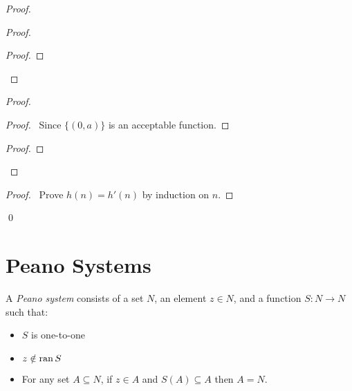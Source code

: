 \begin{proof}
    \begin{proof}
        \begin{proof}
        \end{proof}
    \end{proof}
    \begin{proof}
        \begin{proof}
            \pf\ Since $\{(0,a)\}$ is an acceptable function.
        \end{proof}
        \begin{proof}
        \end{proof}
    \end{proof}
    \begin{proof}
        \pf\ Prove $h(n) = h'(n)$ by induction on $n$.
    \end{proof}
    \qed
\end{proof}

\section{Peano Systems}

\begin{definition}
    A \emph{Peano system} consists of a set $N$, an element $z \in N$,
    and a function $S : N \rightarrow N$ such that:
    \begin{itemize}
        \item $S$ is one-to-one
        \item $z \notin \operatorname{ran} S$
        \item For any set $A \subseteq N$, if $z \in A$ and $S(A) \subseteq A$
        then $A = N$.
    \end{itemize}
\end{definition}


